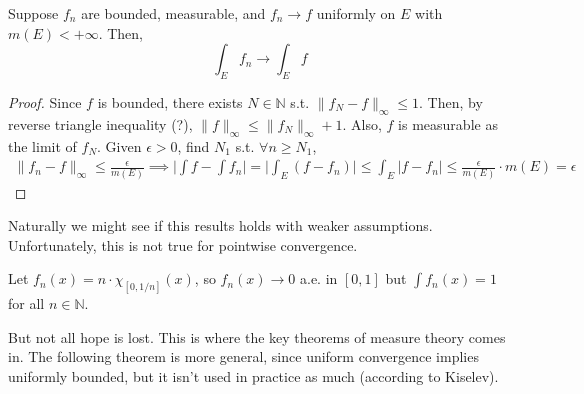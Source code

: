   \begin{theorem}
    Suppose $f_n$ are bounded, measurable, and $f_n \to f$ uniformly on $E$ with $m(E) < +\infty$. Then, 
    \begin{equation}
      \int_E f_n \to \int_E f
    \end{equation}
  \end{theorem} 
  \begin{proof} 
    Since $f$ is bounded, there exists $N \in \mathbb{N}$ s.t. $\| f_N - f \|_{\infty} \leq 1$. Then, by reverse triangle inequality (?), $\|f\|_\infty \leq \|f_N\|_\infty + 1$. Also, $f$ is measurable as the limit of $f_N$. Given $\epsilon > 0$, find $N_1$ s.t. $\forall n \geq N_1$, 
    \begin{align}
      \|f_n - f\|_\infty \leq \frac{\epsilon}{m(E)} \implies  \bigg| \int f - \int f_n \bigg| = \bigg| \int_E (f - f_n) \bigg| \leq \int_E |f - f_n| \leq \frac{\epsilon}{m(E)} \cdot m(E) = \epsilon
    \end{align}
  \end{proof}

  Naturally we might see if this results holds with weaker assumptions. Unfortunately, this is not true for pointwise convergence. 

  \begin{example}
    Let $f_n (x) = n \cdot \chi_{[0, 1/n]} (x)$, so $f_n (x) \to 0$ a.e. in $[0, 1]$ but $\int f_n (x) = 1$ for all $n \in \mathbb{N}$. 
  \end{example}

  But not all hope is lost. This is where the key theorems of measure theory comes in. The following theorem is more general, since uniform convergence implies uniformly bounded, but it isn't used in practice as much (according to Kiselev). 

